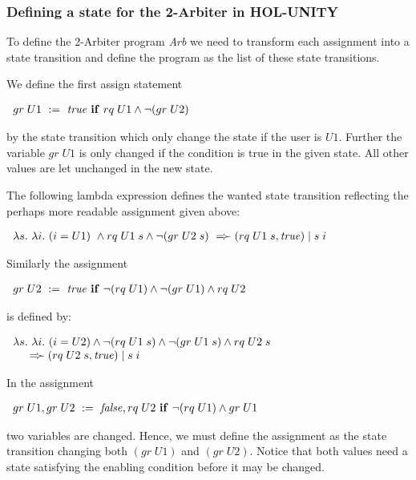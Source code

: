 \subsubsection{Defining a state for the 2-Arbiter in HOL-UNITY}

To define the 2-Arbiter program {\it Arb} we need to transform each assignment
into a state transition and define the program as the list of these state
transitions.

\medskip
We define the first assign statement

\cnn $ \begin{array}{l}
    gr\;U1\ :=\ {\it true}\ {\bf if}\ rq\;U1 \wedge \neg(gr\;U2)
\end{array} $

by the state transition which only change the state if the user is $U1$.
Further the variable $gr\;U1$ is only changed if the condition is true in the
given state. All other values are let unchanged in the new state.

The following lambda expression defines the wanted state transition
reflecting the perhaps more readable assignment given above:

\cnn $ \begin{array}{l}
     \lambda s.\ \lambda i.\
        (i = U1)\ \wedge rq\;U1\;s \wedge \neg(gr\;U2\;s)\ =\!\succ
          (rq\;U1\;s,{\it true}) \mid s\;i
\end{array} $

\medskip
Similarly the assignment

\cnn $ \begin{array}{l}
      gr\;U2\ :=\ {\it true}\ {\bf if}\
                                \neg(rq\;U1) \wedge \neg(gr\;U1) \wedge rq\;U2
\end{array} $

is defined by:

\cnn $ \begin{array}{l}
 \lambda s.\ \lambda i.\
  (i = U2) \wedge \neg(rq\;U1\;s) \wedge \neg(gr\;U1\;s) \wedge rq\;U2\;s\\
     \mbox{ \hspace{3mm}} =\!\succ (rq\;U2\;s,{\it true}) \mid s\;i
\end{array} $

\medskip
In the assignment

\cnn $ \begin{array}{l}
  gr\;U1, gr\;U2\ :=\ {\it false}, rq\;U2\ {\bf if}\ \neg(rq\;U1) \wedge gr\;U1
\end{array} $

two variables are changed.  Hence, we must define the assignment as the state
transition changing both $(gr\;U1)$ and $(gr\;U2)$.  Notice that both values
need a state satisfying the enabling condition before it may be changed.


